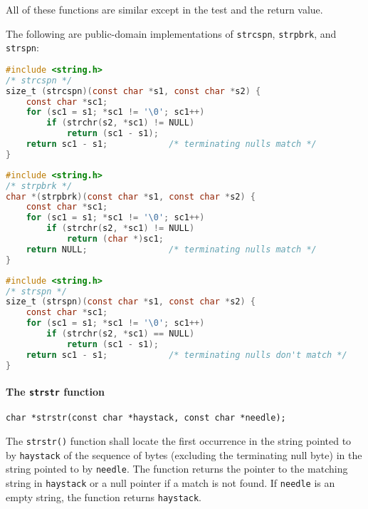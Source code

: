 All of these functions are similar except in the test and the return value.

The following are public-domain implementations of \texttt{strcspn},
\texttt{strpbrk}, and \texttt{strspn}:
\lstset{basicstyle=\scriptsize, numbers=left, captionpos=b, tabsize=4}
\begin{lstlisting}[caption=Section \thesection listing \arabic{stringcnt},language={C},
breaklines=true,xleftmargin=15pt,label=lst:section\thesection listing\arabic{stringcnt}]
#include <string.h>
/* strcspn */
size_t (strcspn)(const char *s1, const char *s2) {
	const char *sc1;
	for (sc1 = s1; *sc1 != '\0'; sc1++)
		if (strchr(s2, *sc1) != NULL)
			return (sc1 - s1);
	return sc1 - s1;			/* terminating nulls match */
}
\end{lstlisting}

\lstset{basicstyle=\scriptsize, numbers=left, captionpos=b, tabsize=4}
\begin{lstlisting}[caption=Section \thesection listing \arabic{stringcnt},language={C},
breaklines=true,xleftmargin=15pt,label=lst:section\thesection listing\arabic{stringcnt}]
#include <string.h>
/* strpbrk */
char *(strpbrk)(const char *s1, const char *s2) {
	const char *sc1;
	for (sc1 = s1; *sc1 != '\0'; sc1++)
		if (strchr(s2, *sc1) != NULL)
			return (char *)sc1;
	return NULL;				/* terminating nulls match */
}
\end{lstlisting}

\lstset{basicstyle=\scriptsize, numbers=left, captionpos=b, tabsize=4}
\begin{lstlisting}[caption=Section \thesection listing \arabic{stringcnt},language={C},
breaklines=true,xleftmargin=15pt,label=lst:section\thesection listing\arabic{stringcnt}]
#include <string.h>
/* strspn */
size_t (strspn)(const char *s1, const char *s2) {
	const char *sc1;
	for (sc1 = s1; *sc1 != '\0'; sc1++)
		if (strchr(s2, *sc1) == NULL)
			return (sc1 - s1);
	return sc1 - s1;			/* terminating nulls don't match */
}
\end{lstlisting}

\paragraph{The \texttt{strstr} function}
\texttt{char *strstr(const char *haystack, const char *needle);}

The \texttt{strstr()} function shall locate the first occurrence in the string
pointed to by \texttt{haystack} of the sequence of bytes (excluding the
terminating null byte) in the string pointed to by \texttt{needle}. The
function returns the pointer to the matching string in \texttt{haystack} or a
null pointer if a match is not found. If \texttt{needle} is an empty string,
the function returns \texttt{haystack}.


